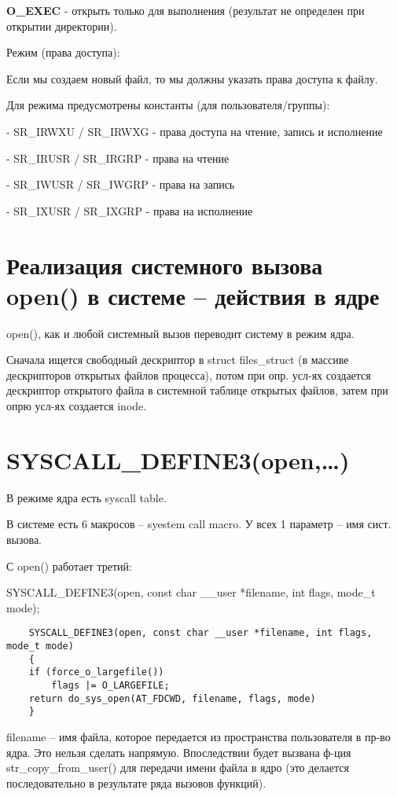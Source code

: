 \textbf{O\_EXEC} - открыть только для выполнения (результат не определен при открытии директории).

Режим (права доступа): 

Если мы создаем новый файл, то мы должны указать права доступа к файлу. 

Для режима предусмотрены константы (для пользователя/группы):

-  SR\_IRWXU / SR\_IRWXG - права доступа на чтение, запись и исполнение

- SR\_IRUSR / SR\_IRGRP - права на чтение

- SR\_IWUSR / SR\_IWGRP - права на запись

- SR\_IXUSR / SR\_IXGRP - права на исполнение

\section{Реализация системного вызова open() в системе – действия в ядре}
open(), как и любой системный вызов переводит систему в режим ядра.

Сначала ищется свободный дескриптор в struct files\_struct (в массиве дескрипторов открытых файлов процесса), потом при опр. усл-ях создается дескриптор открытого файла в системной таблице открытых файлов, затем при опрю усл-ях создается inode.

\section{SYSCALL\_DEFINE3(open,…)}
В режиме ядра есть syscall table.

В системе есть 6 макросов -- syestem call macro. У всех 1 параметр -- имя сист. вызова.

С open() работает третий:

SYSCALL\_DEFINE3(open, const char \_\_user *filename, int flags, mode\_t mode);

\begin{lstlisting}
    SYSCALL_DEFINE3(open, const char __user *filename, int flags, mode_t mode)
    {
    if (force_o_largefile())
        flags |= O_LARGEFILE;
    return do_sys_open(AT_FDCWD, filename, flags, mode)
    }
\end{lstlisting}

filename -- имя файла, которое передается из пространства пользователя в пр-во ядра. Это нельзя сделать напрямую. Впоследствии будет вызвана ф-ция str\_copy\_from\_user() для передачи имени файла в ядро (это делается последовательно в результате ряда вызовов функций).


